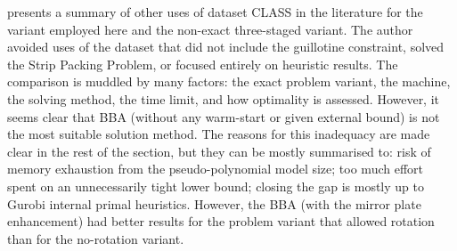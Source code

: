  presents a summary of other uses of dataset CLASS in the literature for the variant employed here and the non-exact three-staged variant.
The author avoided uses of the dataset that did not include the guillotine constraint, solved the Strip Packing Problem, or focused entirely on heuristic results.
The comparison is muddled by many factors: the exact problem variant, the machine, the solving method, the time limit, and how optimality is assessed.
However, it seems clear that BBA (without any warm-start or given external bound) is not the most suitable solution method.
The reasons for this inadequacy are made clear in the rest of the section, but they can be mostly summarised to: risk of memory exhaustion from the pseudo-polynomial model size; too much effort spent on an unnecessarily tight lower bound; closing the gap is mostly up to Gurobi internal primal heuristics.
However, the BBA (with the mirror plate enhancement) had better results for the problem variant that allowed rotation than for the no-rotation variant.

